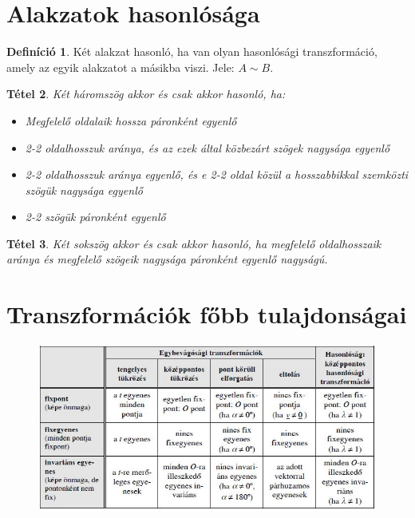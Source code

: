 \documentclass[twoside,12pt]{report}
\newtheorem{theorem}{Tétel}[section]
\theoremstyle{definition}
\newtheorem{definition}[theorem]{Definíció}
\begin{document}
\section{Alakzatok hasonlósága}
	\begin{definition}
		Két alakzat hasonló, ha van olyan hasonlósági transzformáció, amely az egyik alakzatot a másikba viszi. Jele: $A\sim B$.
	\end{definition}
	\begin{theorem}
		Két háromszög akkor és csak akkor hasonló, ha:
		\begin{itemize}
			\item Megfelelő oldalaik hossza páronként egyenlő
			\item 2-2 oldalhosszuk aránya, és az ezek által közbezárt szögek nagysága egyenlő
			\item 2-2 oldalhosszuk aránya egyenlő, és e 2-2 oldal közül a hosszabbikkal szemközti szögük nagysága egyenlő
			\item 2-2 szögük páronként egyenlő
		\end{itemize}
	\end{theorem}
	\begin{theorem}
		Két sokszög akkor és csak akkor hasonló, ha megfelelő oldalhosszaik aránya és megfelelő szögeik nagysága páronként egyenlő nagyságú.
	\end{theorem}
\section{Transzformációk főbb tulajdonságai}
	\begin{figure}[H]
		\centering
		\includegraphics[width=\linewidth]{Hasonl}
	\end{figure}
\end{document}
